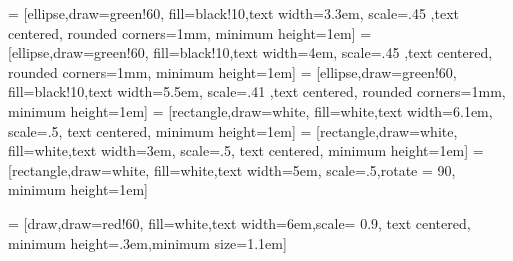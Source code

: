  = [ellipse,draw=green!60, fill=black!10,text width=3.3em, scale=.45 ,text centered, rounded corners=1mm, minimum height=1em]
 = [ellipse,draw=green!60, fill=black!10,text width=4em, scale=.45 ,text centered, rounded corners=1mm, minimum height=1em]
 = [ellipse,draw=green!60, fill=black!10,text width=5.5em, scale=.41 ,text centered, rounded corners=1mm, minimum height=1em]
 = [rectangle,draw=white, fill=white,text width=6.1em, scale=.5, text centered, minimum height=1em]
 = [rectangle,draw=white, fill=white,text width=3em, scale=.5, text centered, minimum height=1em]
 = [rectangle,draw=white, fill=white,text width=5em, scale=.5,rotate = 90, minimum height=1em]

 = [draw,draw=red!60, fill=white,text width=6em,scale= 0.9, text centered, minimum height=.3em,minimum size=1.1em]
